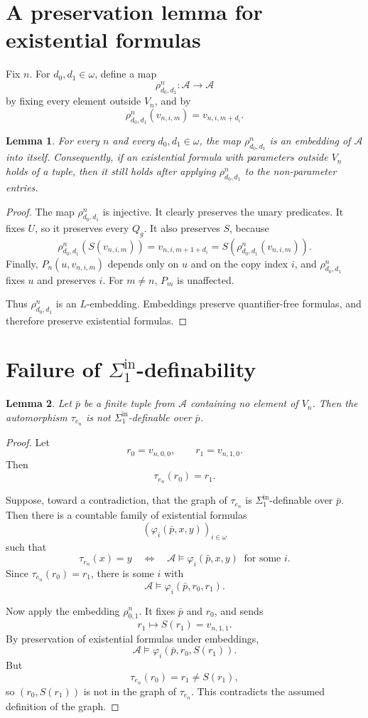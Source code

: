 \documentclass[11pt]{article}
\newtheorem{lemma}{Lemma}
\begin{document}
\section*{A preservation lemma for existential formulas}

Fix $n$.  For $d_0,d_1\in\omega$, define a map
\[
\rho^{n}_{d_0,d_1}:\mathcal A\to\mathcal A
\]
by fixing every element outside $V_n$, and by
\[
\rho^{n}_{d_0,d_1}(v_{n,i,m})=v_{n,i,m+d_i}.
\]

\begin{lemma}
For every $n$ and every $d_0,d_1\in\omega$, the map
$\rho^{n}_{d_0,d_1}$ is an embedding of $\mathcal A$ into itself.
Consequently, if an existential formula with parameters outside $V_n$
holds of a tuple, then it still holds after applying $\rho^{n}_{d_0,d_1}$
to the non-parameter entries.
\end{lemma}

\begin{proof}
The map $\rho^{n}_{d_0,d_1}$ is injective.  It clearly preserves the unary predicates.  It fixes $U$, so it preserves every $Q_g$.  It also preserves $S$, because
\[
\rho^{n}_{d_0,d_1}(S(v_{n,i,m}))
=
v_{n,i,m+1+d_i}
=
S(\rho^{n}_{d_0,d_1}(v_{n,i,m})).
\]
Finally, $P_n(u,v_{n,i,m})$ depends only on $u$ and on the copy index $i$, and $\rho^{n}_{d_0,d_1}$ fixes $u$ and preserves $i$.  For $m\neq n$, $P_m$ is unaffected.

Thus $\rho^{n}_{d_0,d_1}$ is an $L$-embedding.  Embeddings preserve quantifier-free formulas, and therefore preserve existential formulas.
\end{proof}

\section*{Failure of $\Sigma^{\mathrm{in}}_1$-definability}

\begin{lemma}
Let $\bar p$ be a finite tuple from $\mathcal A$ containing no element of
$V_n$.  Then the automorphism $\tau_{e_n}$ is not
$\Sigma^{\mathrm{in}}_1$-definable over $\bar p$.
\end{lemma}

\begin{proof}
Let
\[
r_0=v_{n,0,0},\qquad r_1=v_{n,1,0}.
\]
Then
\[
\tau_{e_n}(r_0)=r_1.
\]

Suppose, toward a contradiction, that the graph of $\tau_{e_n}$ is
$\Sigma^{\mathrm{in}}_1$-definable over $\bar p$.  Then there is a countable
family of existential formulas
\[
(\varphi_i(\bar p,x,y))_{i\in\omega}
\]
such that
\[
\tau_{e_n}(x)=y
\quad\Longleftrightarrow\quad
\mathcal A\models \varphi_i(\bar p,x,y)
\ \text{ for some }i.
\]
Since $\tau_{e_n}(r_0)=r_1$, there is some $i$ with
\[
\mathcal A\models \varphi_i(\bar p,r_0,r_1).
\]

Now apply the embedding $\rho^n_{0,1}$.  It fixes $\bar p$ and $r_0$, and sends
\[
r_1\mapsto S(r_1)=v_{n,1,1}.
\]
By preservation of existential formulas under embeddings,
\[
\mathcal A\models \varphi_i(\bar p,r_0,S(r_1)).
\]
But
\[
\tau_{e_n}(r_0)=r_1\neq S(r_1),
\]
so $(r_0,S(r_1))$ is not in the graph of $\tau_{e_n}$.  This contradicts the assumed definition of the graph.
\end{proof}
\end{document}
